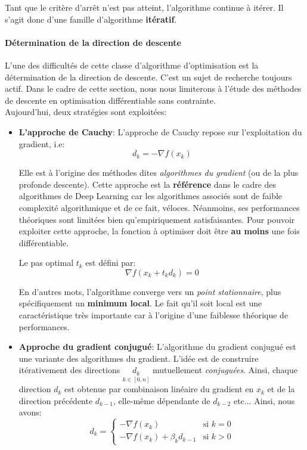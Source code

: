 \noindent Tant que le critère d'arrêt n'est pas atteint, l'algorithme continue à  itérer. Il s'agit donc d'une famille d'algorithme \textbf{itératif}.

\paragraph{Détermination de la direction de descente}
L'une des difficultés de cette classe d'algorithme d'optimisation est la détermination de la direction de descente. C'est un sujet de recherche toujours actif. Dans le cadre de cette section, nous nous limiterons à l'étude des méthodes de descente en optimisation différentiable sans contrainte.\\

\noindent Aujourd'hui, deux stratégies sont exploitées:
\begin{itemize}
    \item \textbf{L'approche de Cauchy}: L'approche de Cauchy repose sur l'exploitation du gradient, i.e:
    $$d_k=-\nabla f(x_k)$$

    Elle est à l'origine des méthodes dites \textit{algorithmes du gradient} (ou de la plus profonde descente). Cette approche est la \textbf{référence} dans le cadre des algorithmes de Deep Learning car les algorithmes associés sont de faible complexité algorithmique et de ce fait, véloces. Néanmoins, ses performances théoriques sont limitées bien qu'empiriquement satisfaisantes. Pour pouvoir exploiter cette approche, la fonction à optimiser doit être \textbf{au moins} une fois différentiable.

    Le pas optimal $t_k$ est défini par:
    $$\nabla f(x_k+t_kd_k)=0$$

    En d'autres mots, l'algorithme converge vers un \textit{point stationnaire}, plus spécifiquement un \textbf{minimum local}. Le fait qu'il soit local est une caractéristique très importante car à l'origine d'une faiblesse théorique de performances.

    \item \textbf{Approche du gradient conjugué}:
    L'algorithme du gradient conjugué est une variante des algorithmes du gradient. L'idée est de construire itérativement des directions $\underset{k \in [0,n]}{d_k}$ mutuellement \textit{conjuguées}. Ainsi, chaque direction $d_k$ est obtenue par combinaison linéaire du gradient en $x_k$ et de la direction précédente $d_{k-1}$, elle-même dépendante de $d_{k-2}$ etc... Ainsi, nous avons:
    $$
        d_k = \left\{
            \begin{array}{ll}
                -\nabla f(x_k) & \mbox{si } k=0 \\
                -\nabla f(x_k) + \beta_kd_{k-1} & \mbox{si } k > 0
            \end{array}
        \right.
    $$


\end{itemize}
